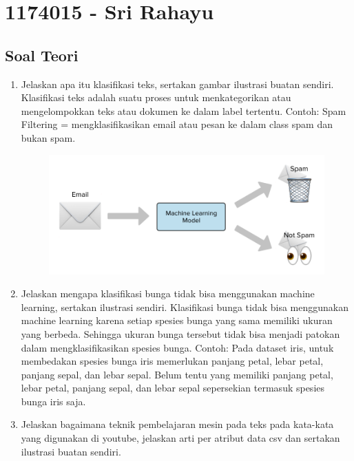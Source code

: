 \section{1174015 - Sri Rahayu}
\subsection{Soal Teori}
\begin{enumerate}
	\item Jelaskan apa itu klasifikasi teks, sertakan gambar ilustrasi buatan sendiri.
	\hfill\break
	Klasifikasi teks adalah suatu proses untuk menkategorikan atau mengelompokkan teks atau dokumen ke dalam label tertentu.
	\hfill\break
	Contoh:
	\hfill\break
	Spam Filtering = mengklasifikasikan email atau pesan ke dalam class spam dan bukan spam.
	\hfill\break
	\begin{figure}[H]
	\centering
		\includegraphics[width=8 cm]{figures/1174015/chapter4/soalteori/1.PNG}
	\end{figure}

	\item Jelaskan mengapa klasifikasi bunga tidak bisa menggunakan machine learning, sertakan ilustrasi sendiri.
	\hfill\break
	Klasifikasi bunga tidak bisa menggunakan machine learning karena setiap spesies bunga yang sama memiliki ukuran yang berbeda. Sehingga ukuran bunga tersebut tidak bisa menjadi patokan dalam mengklasifikasikan spesies bunga.
	\hfill\break
	Contoh:
	\hfill\break
	Pada dataset iris, untuk membedakan spesies bunga iris memerlukan panjang petal, lebar petal, panjang sepal, dan lebar sepal. Belum tentu yang memiliki panjang petal, lebar petal, panjang sepal, dan lebar sepal sepersekian termasuk spesies bunga iris saja.

	\item Jelaskan bagaimana teknik pembelajaran mesin pada teks pada kata-kata yang digunakan di youtube, jelaskan arti per atribut data csv dan sertakan ilustrasi buatan sendiri.
	

\end{enumerate}
